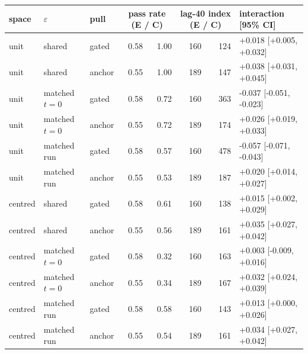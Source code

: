 \begin{tabular}{lllrrrrl}
\toprule
space & $\varepsilon$ & pull & \multicolumn{2}{c}{pass rate (E / C)} & \multicolumn{2}{c}{lag-40 index (E / C)} & interaction [95\% CI] \\
\midrule
unit & shared & gated & 0.58 & 1.00 & 160 & 124 & +0.018 [+0.005, +0.032] \\
unit & shared & anchor & 0.55 & 1.00 & 189 & 147 & +0.038 [+0.031, +0.045] \\
unit & matched $t{=}0$ & gated & 0.58 & 0.72 & 160 & 363 & -0.037 [-0.051, -0.023] \\
unit & matched $t{=}0$ & anchor & 0.55 & 0.72 & 189 & 174 & +0.026 [+0.019, +0.033] \\
unit & matched run & gated & 0.58 & 0.57 & 160 & 478 & -0.057 [-0.071, -0.043] \\
unit & matched run & anchor & 0.55 & 0.53 & 189 & 187 & +0.020 [+0.014, +0.027] \\
centred & shared & gated & 0.58 & 0.61 & 160 & 138 & +0.015 [+0.002, +0.029] \\
centred & shared & anchor & 0.55 & 0.56 & 189 & 161 & +0.035 [+0.027, +0.042] \\
centred & matched $t{=}0$ & gated & 0.58 & 0.32 & 160 & 163 & +0.003 [-0.009, +0.016] \\
centred & matched $t{=}0$ & anchor & 0.55 & 0.34 & 189 & 167 & +0.032 [+0.024, +0.039] \\
centred & matched run & gated & 0.58 & 0.58 & 160 & 143 & +0.013 [+0.000, +0.026] \\
centred & matched run & anchor & 0.55 & 0.54 & 189 & 161 & +0.034 [+0.027, +0.042] \\
\bottomrule
\end{tabular}
